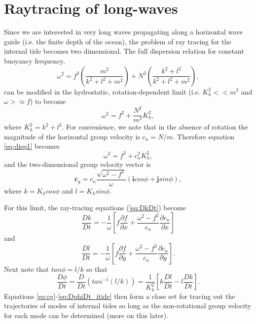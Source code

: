 \documentclass[12pt]{article}
\begin{document}
\section{Raytracing of long-waves}

Since we are interested in very long waves propagating along a horizontal wave guide (i.e. the finite depth of the ocean), the problem of ray tracing for the internal tide becomes two dimensional. The full dispersion relation for constant buoyancy frequency,
\begin{equation}
	\omega^2 = f^2\left(\frac{m^2}{k^2+l^2+m^2}\right) + N^2\left(\frac{k^2+l^2}{k^2+l^2+m^2}\right),
\end{equation}
can be modified in the hydrostatic, rotation-dependent limit (i.e. $K_h^2<<m^2$ and $\omega>\approx f$) to become
\begin{equation}
	\label{eq:disp1}
	\omega^2 = f^2 + \frac{N^2}{m^2}K_h^2,
\end{equation}
where $K_h^2=k^2+l^2$. For convenience, we note that in the absence of rotation the magnitude of the horizontal group velocity is $c_n = N/m$. Therefore equation \ref{eq:disp1} becomes
\begin{equation}
	\label{eq:disp}
	\omega^2 = f^2 + c_n^2K_h^2,
\end{equation}
and the two-dimensional group velocity vector is
\begin{equation}
	\label{eq:cg}
	\textbf{c}_g = c_n\frac{\sqrt{\omega^2-f^2}}{\omega}\left(\textbf{i}cos\phi + \textbf{j}sin\phi \right),
\end{equation}
where $k = K_hcos\phi$ and $l = K_hsin\phi$.

For this limit, the ray-tracing equations (\ref{eq:DkDt}) become
\begin{equation}
	\label{eq:DkDt_itide}
	\frac{Dk}{Dt} = -\frac{1}{\omega}\left[f\frac{\partial f}{\partial x} + \frac{\omega^2-f^2}{c_n}\frac{\partial c_n}{\partial x} \right]
\end{equation}
and
\begin{equation}
	\label{eq:DlDt_itide}
	\frac{Dl}{Dt} = -\frac{1}{\omega}\left[f\frac{\partial f}{\partial y} + \frac{\omega^2-f^2}{c_n}\frac{\partial c_n}{\partial y} \right].
\end{equation}
Next note that $tan\phi = l/k$ so that 
\begin{equation}
	\label{eq:DphiDt_itide}
	\frac{D\phi}{Dt} = \frac{D}{Dt}\left(tan^{-1}(l/k)\right) = \frac{1}{K_h^2}\left[k\frac{Dl}{Dt} - l\frac{Dk}{Dt}\right].
\end{equation}
Equations \ref{eq:cg}-\ref{eq:DphiDt_itide} then form a close set for tracing out the trajectories of modes of internal tides so long as the non-rotational group velocity for each mode can be determined (more on this later).
\end{document}
